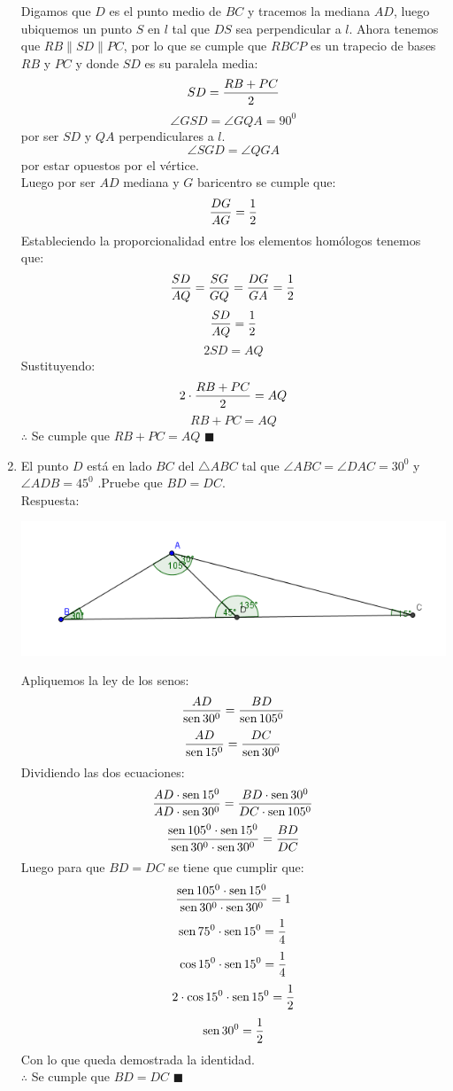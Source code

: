 \documentclass{book}
\newcommand{\sen}{\mathop{\rm sen}\nolimits} %
\begin{document}
\begin{enumerate}
\begin{center}
					\end{center}
					Digamos que $D$ es el punto medio de $BC$ y tracemos la mediana $AD$, luego ubiquemos un punto $S$ en $l$ tal que $DS$ sea perpendicular a $l$. Ahora tenemos que $RB\parallel SD\parallel PC$, por lo que se cumple que $RBCP$ es un trapecio de bases $RB$ y $PC$ y donde $SD$ es su paralela media:
$$SD={RB+PC\over 2}$$
$$\angle GSD=\angle GQA={90} ^0$$
por ser $SD$ y $QA$ perpendiculares a $l$.
$$\angle SGD=\angle QGA$$
por estar opuestos por el vértice.\\
 
Luego por ser $AD$ mediana y $G$ baricentro se cumple que:
$${DG\over AG}={1\over 2}$$
Estableciendo la proporcionalidad entre los elementos homólogos tenemos que:
$${SD\over AQ}={SG\over GQ}={DG\over GA}={1\over 2}$$
$${SD\over AQ}={1\over 2}$$
$$2SD=AQ$$
Sustituyendo:
$$2\cdot{RB+PC\over 2}=AQ$$
$$RB+PC=AQ$$
$\therefore$ Se cumple que $RB+PC=AQ$ $\blacksquare$\\
				\item El punto $D$ está en lado $BC$ del $\triangle ABC$ tal que $\angle ABC = \angle DAC = 30^0$  y $ \angle ADB = 45^0$  .Pruebe que  $BD = DC$. \\
					Respuesta:
					\begin{center}
						\includegraphics[scale=1]{imagenes/Geometria/6.png}
					\end{center}
					Apliquemos la ley de los senos:
$$\frac{AD}{\sen{30^0}} =\frac{BD}{\sen{105^0} } $$
$$\frac{AD}{\sen{15^0}} =\frac{DC}{\sen{30^0} }$$ 
Dividiendo las dos ecuaciones:
$$\frac{AD\cdot\sen{15^0}}{AD\cdot\sen{30^0}}=\frac{BD\cdot\sen{30^0}}{DC\cdot\sen{105^0} } $$
$$\frac{\sen{105^0}\cdot\sen{15^0}}{\sen{30^0}\cdot\sen{30^0}}=\frac{BD}{DC} $$
Luego para que $BD= DC$ se tiene que cumplir que:
$$\frac{\sen{105^0}\cdot\sen{15^0}}{\sen{30^0}\cdot\sen{30^0}}=1 $$
$$\sen{75^0}\cdot\sen{15^0}={1\over 4}$$
$$\cos{15^0}\cdot\sen{15^0}={1\over 4}$$
$$2\cdot\cos{15^0}\cdot\sen{15^0}={1\over 2}$$
$$\sen{30^0}={1\over 2}$$
Con lo que queda demostrada la identidad.\\
$\therefore$ Se cumple que $BD= DC$ $\blacksquare$\\

\end{enumerate}
\end{document}
